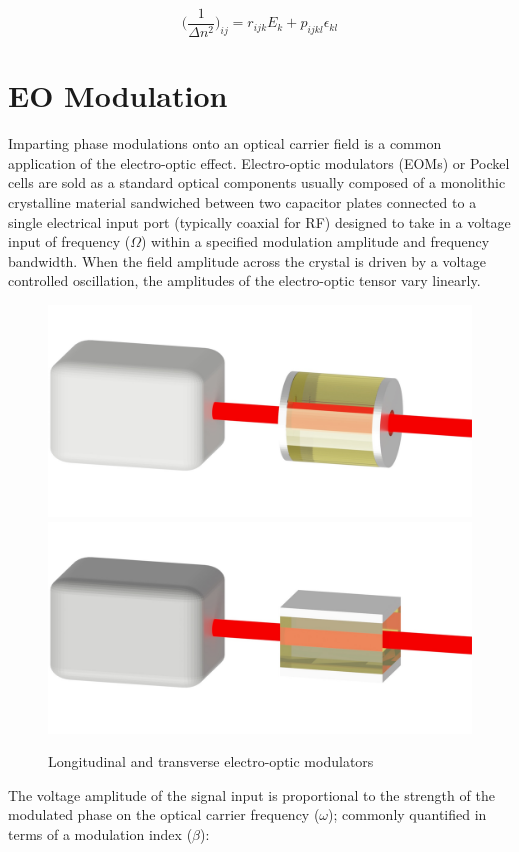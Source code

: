 \begin{equation}\label{eq:indicgen}
	\bigg( \frac{1}{\Delta n^2} \bigg)_{ij} = r_{ijk}E_k + p_{ijkl} \epsilon_{kl}
\end{equation}



\section{EO Modulation}\label{sec:EOM}
Imparting phase modulations onto an optical carrier field is a common application of the electro-optic effect. Electro-optic modulators (EOMs) or Pockel cells are sold as a standard optical components usually composed of a monolithic crystalline material sandwiched between two capacitor plates connected to a single electrical input port (typically coaxial for RF) designed to take in a voltage input of frequency ($\Omega$) within a specified modulation amplitude and frequency bandwidth. When the field amplitude across the crystal is driven by a voltage controlled oscillation, the amplitudes of the electro-optic tensor vary linearly. 

\begin{figure}[H]
    \centering
    \includegraphics[width=.5\textwidth]{figs/ALGAAS/eom_l_assembly.pdf}
    \\
    \vspace{-9mm}
    \includegraphics[width=.5\textwidth]{figs/ALGAAS/eom_t_assembly.pdf}
\caption{Longitudinal and transverse electro-optic modulators}
\label{fig:EOM_types}
\end{figure}

The voltage amplitude of the signal input is proportional to the strength of the modulated phase on the optical carrier frequency ($\omega$); commonly quantified in terms of a modulation index ($\beta$):

